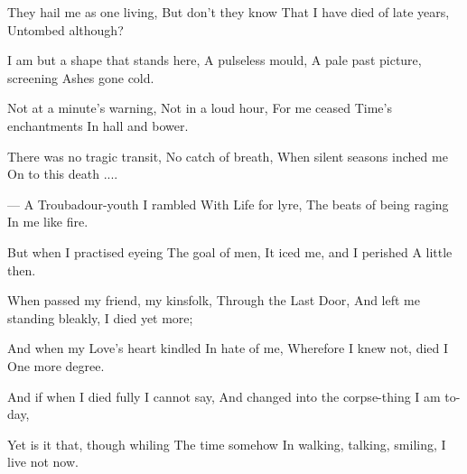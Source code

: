 \documentclass[fontsize=9, a5paper]{scrbook}
\begin{document}
\begin{poem}
	\begin{stanza}
		They hail me as one living,\verseline
		But don't they know\verseline
		That I have died of late years,\verseline
		Untombed although?
	\end{stanza}
	
	\begin{stanza}
		I am but a shape that stands here,\verseline
		A pulseless mould,\verseline
		A pale past picture, screening\verseline
		Ashes gone cold.
	\end{stanza}
	
	\begin{stanza}
		Not at a minute's warning,\verseline
		Not in a loud hour,\verseline
		For me ceased Time's enchantments\verseline
		In hall and bower.
	\end{stanza}
	
	\begin{stanza}
		There was no tragic transit,\verseline
		No catch of breath,\verseline
		When silent seasons inched me\verseline
		On to this death ....
	\end{stanza}
	
	\begin{stanza}
		— A Troubadour-youth I rambled\verseline
		With Life for lyre,\verseline
		The beats of being raging\verseline
		In me like fire.
	\end{stanza}

	\pagebreak

	\begin{stanza}
		But when I practised eyeing\verseline
		The goal of men,\verseline
		It iced me, and I perished\verseline
		A little then.
	\end{stanza}
	
	\begin{stanza}
		When passed my friend, my kinsfolk,\verseline
		Through the Last Door,\verseline
		And left me standing bleakly,\verseline
		I died yet more;
	\end{stanza}
	
	\begin{stanza}
		And when my Love's heart kindled\verseline
		In hate of me,\verseline
		Wherefore I knew not, died I\verseline
		One more degree.
	\end{stanza}
	
	\begin{stanza}
		And if when I died fully\verseline
		I cannot say,\verseline
		And changed into the corpse-thing\verseline
		I am to-day,
	\end{stanza}
	
	\begin{stanza}
		Yet is it that, though whiling\verseline
		The time somehow\verseline
		In walking, talking, smiling,\verseline
		I live not now. 
	\end{stanza}
\end{poem}
\end{document}
